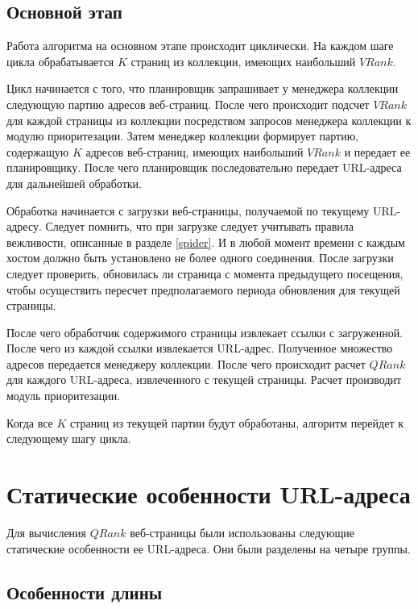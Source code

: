 \subsection*{Основной этап}

Работа алгоритма на основном этапе происходит циклически. На каждом шаге цикла обрабатывается $K$ страниц из коллекции, имеющих наибольший $VRank$. 

Цикл начинается с того, что планировщик запрашивает у менеджера коллекции следующую партию адресов веб-страниц. После чего происходит подсчет $VRank$ для каждой страницы из коллекции посредством запросов менеджера коллекции к модулю приоритезации. Затем менеджер коллекции формирует партию, содержащую $K$ адресов веб-страниц, имеющих наибольший $VRank$ и передает ее планировщику. После чего планировщик последовательно передает URL-адреса для дальнейшей обработки. 

Обработка начинается с загрузки веб-страницы, получаемой по текущему URL-адресу. Следует помнить, что при загрузке следует учитывать правила вежливости, описанные в разделе \ref{spider}. И в любой момент времени с каждым хостом должно быть установлено не более одного соединения. После загрузки следует проверить, обновилась ли страница с момента предыдущего посещения, чтобы осуществить пересчет предполагаемого периода обновления для текущей страницы.

После чего обработчик содержимого страницы извлекает ссылки с загруженной. После чего из каждой ссылки извлекается URL-адрес. Полученное множество адресов передается менеджеру коллекции. После чего происходит расчет $QRank$ для каждого URL-адреса, извлеченного с текущей страницы. Расчет производит модуль приоритезации.

Когда все $K$ страниц из текущей партии будут обработаны, алгоритм перейдет к следующему шагу цикла.

\section{Статические особенности URL-адреса}
\label{static_features}

Для вычисления $QRank$ веб-страницы были использованы следующие статические особенности ее URL-адреса. Они были разделены на четыре группы.

\subsection*{Особенности длины}

